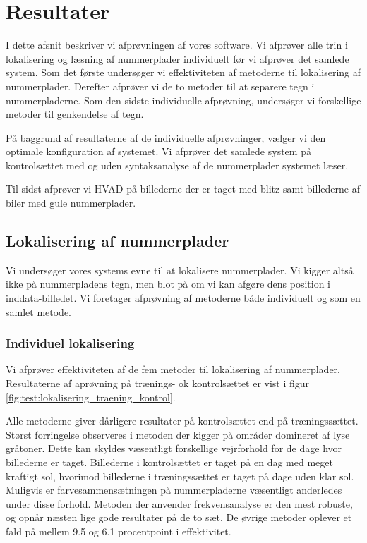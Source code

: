 \section{Resultater}
\label{sec:resultater}
I dette afsnit beskriver vi afprøvningen af vores software. Vi afprøver alle trin i lokalisering og læsning af nummerplader individuelt før vi afprøver det samlede system. Som det første undersøger vi effektiviteten af metoderne til lokalisering af nummerplader. Derefter afprøver vi de to metoder til at separere tegn i nummerpladerne. Som den sidste individuelle afprøvning, undersøger vi forskellige metoder til genkendelse af tegn.

På baggrund af resultaterne af de individuelle afprøvninger, vælger vi den optimale konfiguration af systemet. Vi afprøver det samlede system på kontrolsættet med og uden syntaksanalyse af de nummerplader systemet læser.

Til sidst afprøver vi HVAD på billederne der er taget med blitz samt billederne af biler med gule nummerplader.


\subsection{Lokalisering af nummerplader}
Vi undersøger vores systems evne til at lokalisere nummerplader. Vi kigger altså ikke på nummerpladens tegn, men blot på om vi kan afgøre dens position i inddata-billedet. Vi foretager afprøvning af metoderne både individuelt og som en samlet metode.

\subsubsection{Individuel lokalisering}
Vi afprøver effektiviteten af de fem metoder til lokalisering af nummerplader. Resultaterne af aprøvning på trænings- ok kontrolsættet er vist i figur \vref{fig:test:lokalisering_traening_kontrol}.

Alle metoderne giver dårligere resultater på kontrolsættet end på træningssættet. Størst forringelse observeres i metoden der kigger på områder domineret af lyse gråtoner. Dette kan skyldes væsentligt forskellige vejrforhold for de dage hvor billederne er taget. Billederne i kontrolsættet er taget på en dag med meget kraftigt sol, hvorimod billederne i træningssættet er taget på dage uden klar sol. Muligvis er farvesammensætningen på nummerpladerne væsentligt anderledes under disse forhold. Metoden der anvender frekvensanalyse er den mest robuste, og opnår næsten lige gode resultater på de to sæt. De øvrige metoder oplever et fald på mellem 9.5 og 6.1 procentpoint i effektivitet.

